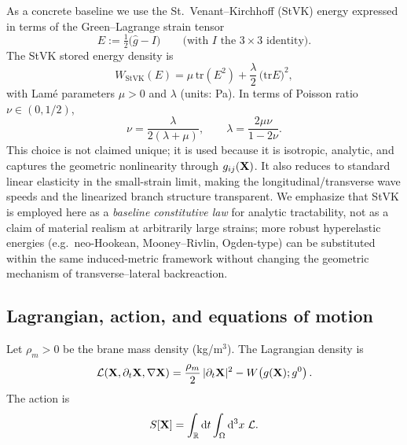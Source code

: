 As a concrete baseline we use the St.\ Venant--Kirchhoff (StVK) energy expressed in terms of the
Green--Lagrange strain tensor
\begin{equation}
  E := \tfrac12\big(\widehat g - I\big)
  \qquad\text{(with $I$ the $3\times 3$ identity)}.
  \label{eq:green-lagrange-strain}
\end{equation}
The StVK stored energy density is
\begin{equation}
  W_{\text{StVK}}(E)
  = \mu\,\mathrm{tr}(E^2)+\frac{\lambda}{2}\,\big(\mathrm{tr}E\big)^2,
  \label{eq:stvk}
\end{equation}
with Lam\'e parameters $\mu>0$ and $\lambda$ (units: Pa). In terms of Poisson ratio $\nu\in(0,1/2)$,
\begin{equation}
\nu=\frac{\lambda}{2(\lambda+\mu)},
\qquad
\lambda=\frac{2\mu\nu}{1-2\nu}.
\label{eq:poisson-lame}
\end{equation}
This choice is not claimed unique; it is used because it is isotropic, analytic, and captures the
geometric nonlinearity through $g_{ij}(\mathbf{X})$.
It also reduces to standard linear elasticity in the small-strain limit, making the longitudinal/transverse
wave speeds and the linearized branch structure transparent.
We emphasize that StVK is employed here as a \emph{baseline constitutive law} for analytic tractability, not as a
claim of material realism at arbitrarily large strains; more robust hyperelastic energies (e.g.\ neo-Hookean,
Mooney--Rivlin, Ogden-type) can be substituted within the same induced-metric framework without changing the
geometric mechanism of transverse--lateral backreaction.

\subsection{Lagrangian, action, and equations of motion}

Let $\rho_m>0$ be the brane mass density (kg/m$^3$). The Lagrangian density is
\begin{equation}
  \mathcal{L}(\mathbf{X},\partial_t\mathbf{X},\nabla\mathbf{X})
  =\frac{\rho_m}{2}\,|\partial_t\mathbf{X}|^2
  -W\!\left(g(\mathbf{X});g^0\right).
  \label{eq:lagrangian-density}
\end{equation}
The action is
\begin{equation}
  S[\mathbf{X}] = \int_{\mathbb{R}}\mathrm{d} t \int_{\Omega} \mathrm{d}^3 x\;\mathcal{L}.
  \label{eq:action}
\end{equation}

